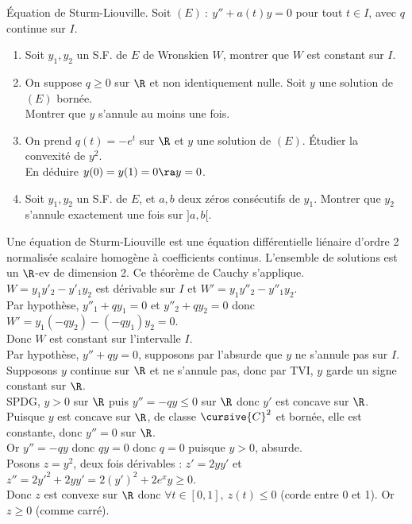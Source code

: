 \documentclass[11pt]{article}
\begin{document}
\begin{exercice}{Équation de Sturm-Liouville.}{}
    Soit $(E) ~:~ y'' + a(t)y = 0$ pour tout $t\in I$, avec $q$ continue sur $I$.
    \begin{enumerate}
        \item Soit $y_1,y_2$ un S.F. de $E$ de Wronskien $W$, montrer que $W$ est constant sur $I$.
        \item On suppose $q\geq0$ sur $\R$ et non identiquement nulle. Soit $y$ une solution de $(E)$ bornée.\\
        Montrer que $y$ s'annule au moins une fois.
        \item On prend $q(t)=-e^t$ sur $\R$ et $y$ une solution de $(E)$. Étudier la convexité de $y^2$.\\
        En déduire $y(0)=y(1)=0 \ra y = 0$.
        \item Soit $y_1,y_2$ un S.F. de $E$, et $a,b$ deux zéros consécutifs de $y_1$. Montrer que $y_2$ s'annule exactement une fois sur $]a,b[$.
    \end{enumerate}
    \tcblower
    Une équation de Sturm-Liouville est une équation différentielle liénaire d'ordre 2 normalisée scalaire homogène à coefficients continus. L'ensemble de solutions est un $\R$-ev de dimension 2. Ce théorème de Cauchy s'applique.\\
     $W=y_1y'_2-y'_1y_2$ est dérivable sur $I$ et $W'=y_1y''_2-y''_1y_2$.\\
    Par hypothèse, $y''_1+qy_1 = 0$ et $y''_2 + qy_2 = 0$ donc $W' = y_1(-qy_2)-(-qy_1)y_2=0$.\\ Donc $W$ est constant sur l'intervalle $I$.\\
     Par hypothèse, $y''+qy=0$, supposons par l'absurde que $y$ ne s'annule pas sur $I$.\\
    Supposons $y$ continue sur $\R$ et ne s'annule pas, donc par TVI, $y$ garde un signe constant sur $\R$.\\
    SPDG, $y>0$ sur $\R$ puis $y'' = -qy \leq 0$ sur $\R$ donc $y'$ est concave sur $\R$.\\
    Puisque $y$ est concave sur $\R$, de classe $\cursive{C}^2$ et bornée, elle est constante, donc $y''=0$ sur $\R$.\\
    Or $y''=-qy$ donc $qy=0$ donc $q=0$ puisque $y>0$, absurde.\\
     Posons $z=y^2$, deux fois dérivables : $z' = 2yy'$ et $z''=2y'^2 + 2yy' = 2(y')^2 + 2e^xy\geq0$.\\
    Donc $z$ est convexe sur $\R$ donc $\forall t \in [0,1], ~ z(t)\leq 0$ (corde entre 0 et 1). Or $z\geq0$ (comme carré).\\

\end{exercice}
\end{document}
